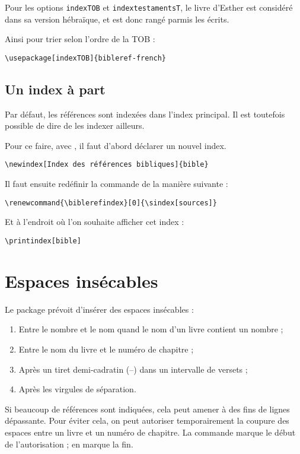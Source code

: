 Pour les options \verb|indexTOB| et \verb|indextestamentsT|, le livre d'Esther est considéré dans sa version hébraïque, et est donc rangé parmis les  écrits.

Ainsi pour trier selon l'ordre de la TOB : 
\begin{verbatim}
\usepackage[indexTOB]{bibleref-french}
\end{verbatim}


\subsection{Un index à part}

Par défaut, les références sont indexées dans l'index principal. Il est toutefois possible de dire de les indexer ailleurs.

Pour ce faire, avec , il faut d'abord déclarer un nouvel index.

\begin{verbatim}
\newindex[Index des références bibliques]{bible}
\end{verbatim}

Il faut ensuite redéfinir la commande  de la manière suivante :
\begin{verbatim}
\renewcommand{\biblerefindex}[0]{\sindex[sources]}
\end{verbatim}

Et à l'endroit où l'on souhaite afficher cet index :
\begin{verbatim}
\printindex[bible]
\end{verbatim}

\section{Espaces insécables}

Le package  prévoit d'insérer des espaces insécables :
\begin{enumerate}
\item Entre le nombre et le nom quand le nom d’un livre contient un nombre ;
\item Entre le nom du livre et le numéro de chapitre ;
\item Après un tiret demi-cadratin (–) dans un intervalle de versets ; 
\item Après les virgules de séparation.
\end{enumerate}

Si beaucoup de références sont indiquées, cela peut amener à des fins de lignes dépassante.
Pour éviter cela, on peut autoriser temporairement la coupure des espaces entre un livre et un numéro de chapitre. La commande  marque le début de l'autorisation ;  en marque la fin.

